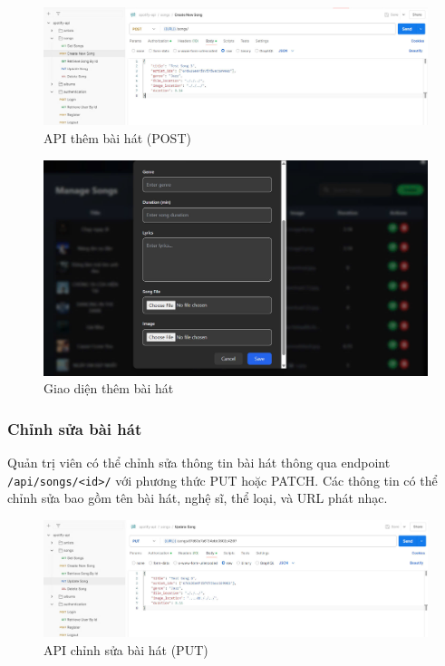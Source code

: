 \begin{figure}[H]
    \centering
    \includegraphics[width=1\textwidth]{imgs/api-add-song.jpg}
    \caption{API thêm bài hát (POST)}
\end{figure}

\begin{figure}[H]
    \centering
    \includegraphics[width=1\textwidth]{imgs/frontend-add-song.jpg}
    \caption{Giao diện thêm bài hát}
\end{figure}

\subsubsection{Chỉnh sửa bài hát}
Quản trị viên có thể chỉnh sửa thông tin bài hát thông qua endpoint \texttt{/api/songs/<id>/} với phương thức PUT hoặc PATCH. Các thông tin có thể chỉnh sửa bao gồm tên bài hát, nghệ sĩ, thể loại, và URL phát nhạc.

\begin{figure}[H]
    \centering
    \includegraphics[width=1\textwidth]{imgs/api-edit-song.jpg}
    \caption{API chỉnh sửa bài hát (PUT)}
\end{figure}

